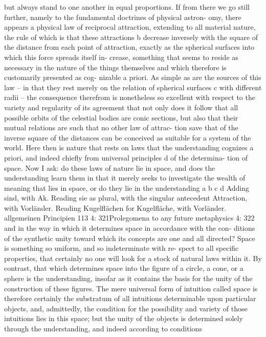 but always stand to one another in equal proportions. If from there we
go still further, namely to the fundamental doctrines of physical astron-
omy, there appears a physical law of reciprocal attraction, extending to
all material nature, the rule of which is that these attractions b decrease
inversely with the square of the distance from each point of attraction,
exactly as the spherical surfaces into which this force spreads itself in-
crease, something that seems to reside as necessary in the nature of the
things themselves and which therefore is customarily presented as cog-
nizable a priori. As simple as are the sources of this law – in that they
rest merely on the relation of spherical surfaces c with different radii –
the consequence therefrom is nonetheless so excellent with respect to
the variety and regularity of its agreement that not only does it follow
that all possible orbits of the celestial bodies are conic sections, but
also that their mutual relations are such that no other law of attrac-
tion save that of the inverse square of the distances can be conceived as
suitable for a system of the world.
Here then is nature that rests on laws that the understanding cognizes
a priori, and indeed chieﬂy from universal principles d of the determina-
tion of space. Now I ask: do these laws of nature lie in space, and does
the understanding learn them in that it merely seeks to investigate the
wealth of meaning that lies in space, or do they lie in the understanding
a
b
c
d
Adding sind, with Ak.
Reading sie as plural, with the singular antecedent Attraction, with Vorländer.
Reading Kugelﬂächen for Kugelﬂäche, with Vorländer.
allgemeinen Principien
113
4: 321Prolegomena to any future metaphysics
4: 322
and in the way in which it determines space in accordance with the con-
ditions of the synthetic unity toward which its concepts are one and all
directed? Space is something so uniform, and so indeterminate with re-
spect to all speciﬁc properties, that certainly no one will look for a stock
of natural laws within it. By contrast, that which determines space into
the ﬁgure of a circle, a cone, or a sphere is the understanding, insofar
as it contains the basis for the unity of the construction of these ﬁgures.
The mere universal form of intuition called space is therefore certainly
the substratum of all intuitions determinable upon particular objects,
and, admittedly, the condition for the possibility and variety of those
intuitions lies in this space; but the unity of the objects is determined
solely through the understanding, and indeed according to conditions
